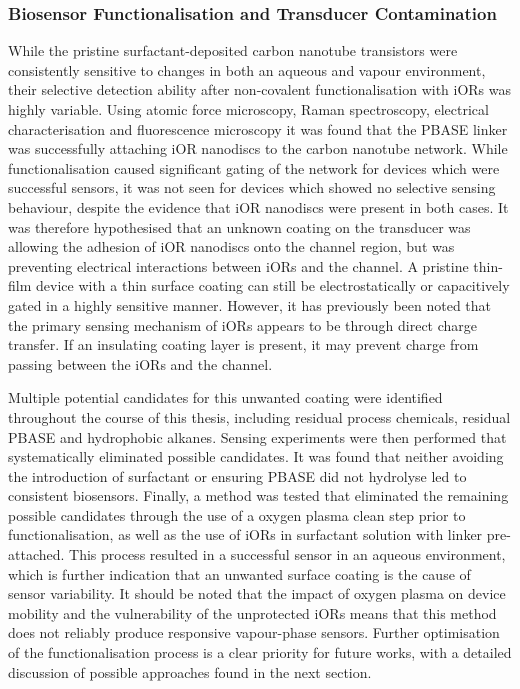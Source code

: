 \documentclass[
  letterpaper,
  DIV=11,
  numbers=noendperiod]{scrartcl}
\begin{document}
\hypertarget{biosensor-functionalisation-and-transducer-contamination}{%
\subsubsection{Biosensor Functionalisation and Transducer
Contamination}\label{biosensor-functionalisation-and-transducer-contamination}}

While the pristine surfactant-deposited carbon nanotube transistors were
consistently sensitive to changes in both an aqueous and vapour
environment, their selective detection ability after non-covalent
functionalisation with iORs was highly variable. Using atomic force
microscopy, Raman spectroscopy, electrical characterisation and
fluorescence microscopy it was found that the PBASE linker was
successfully attaching iOR nanodiscs to the carbon nanotube network.
While functionalisation caused significant gating of the network for
devices which were successful sensors, it was not seen for devices which
showed no selective sensing behaviour, despite the evidence that iOR
nanodiscs were present in both cases. It was therefore hypothesised that
an unknown coating on the transducer was allowing the adhesion of iOR
nanodiscs onto the channel region, but was preventing electrical
interactions between iORs and the channel. A pristine thin-film device
with a thin surface coating can still be electrostatically or
capacitively gated in a highly sensitive manner. However, it has
previously been noted that the primary sensing mechanism of iORs appears
to be through direct charge transfer. If an insulating coating layer is
present, it may prevent charge from passing between the iORs and the
channel.

Multiple potential candidates for this unwanted coating were identified
throughout the course of this thesis, including residual process
chemicals, residual PBASE and hydrophobic alkanes. Sensing experiments
were then performed that systematically eliminated possible candidates.
It was found that neither avoiding the introduction of surfactant or
ensuring PBASE did not hydrolyse led to consistent biosensors. Finally,
a method was tested that eliminated the remaining possible candidates
through the use of a oxygen plasma clean step prior to
functionalisation, as well as the use of iORs in surfactant solution
with linker pre-attached. This process resulted in a successful sensor
in an aqueous environment, which is further indication that an unwanted
surface coating is the cause of sensor variability. It should be noted
that the impact of oxygen plasma on device mobility and the
vulnerability of the unprotected iORs means that this method does not
reliably produce responsive vapour-phase sensors. Further optimisation
of the functionalisation process is a clear priority for future works,
with a detailed discussion of possible approaches found in the next
section.
\end{document}
